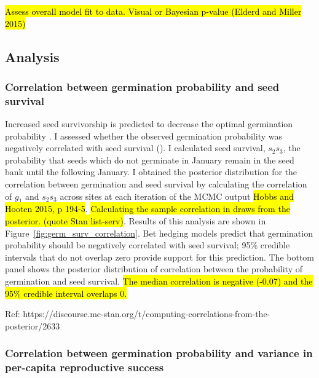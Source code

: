 \documentclass[12pt, oneside, titlepage]{article}   	%
\begin{document}
\hl{Assess overall model fit to data. Visual or Bayesian p-value (Elderd and Miller 2015)}

\subsection*{Analysis}

\subsubsection*{Correlation between germination probability and seed survival}

Increased seed survivorship is predicted to decrease the optimal germination probability \cite{cohen1966,ellner1985a}. I assessed whether the observed germination probability was negatively correlated with seed survival (\cite{gremer2014}). I calculated seed survival, $s_2 s_3$, the probability that seeds which do not germinate in January remain in the seed bank until the following January. I obtained the posterior distribution for the correlation between germination and seed survival by calculating the correlation of $g_1$ and $s_2 s_3$ across sites at each iteration of the MCMC output \hl{Hobbs and Hooten 2015, p 194-5}. \hl{Calculating the sample correlation in draws from the posterior. (quote Stan list-serv)}. Results of this analysis are shown in Figure~\ref{fig:germ_surv_correlation}. Bet hedging models predict that germination probability should be negatively correlated with seed survival; 95\% credible intervals that do not overlap zero provide support for this prediction. The bottom panel shows the posterior distribution of correlation between the probability of germination and seed survival. \hl{The median correlation is negative (-0.07) and the 95\% credible interval overlaps 0.}

Ref: https://discourse.mc-stan.org/t/computing-correlations-from-the-posterior/2633

\subsubsection*{Correlation between germination probability and variance in per-capita reproductive success}
\end{document}
